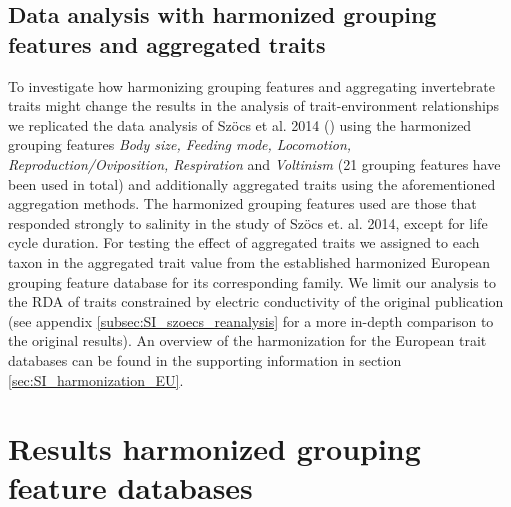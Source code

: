 \documentclass{article}
\begin{document}
\subsection*{Data analysis with harmonized grouping features and aggregated traits}

To investigate how harmonizing grouping features and aggregating invertebrate traits might change the results in the analysis of trait-environment relationships we replicated the data analysis of Szöcs et al. 2014 (\cite{szocs_effects_2014}) using the harmonized grouping features \textit{Body size, Feeding mode, Locomotion, Reproduction/Oviposition, Respiration} and \textit{Voltinism} (21 grouping features have been used in total) and additionally aggregated traits using the aforementioned aggregation methods. The harmonized grouping features used are those that responded strongly to salinity in the study of Szöcs et. al. 2014, except for life cycle duration. For testing the effect of aggregated traits we assigned to each taxon in \cite{szocs_effects_2014} the aggregated trait value from the established harmonized European grouping feature database for its corresponding family. We limit our analysis to the RDA of traits constrained by electric conductivity of the original publication (see appendix \ref{subsec:SI_szoecs_reanalysis} for a more in-depth comparison to the original results). An overview of the harmonization for the European trait databases can be found in the supporting information in section \ref{sec:SI_harmonization_EU}.




\newpage
\section*{Results harmonized grouping feature databases}
\end{document}
